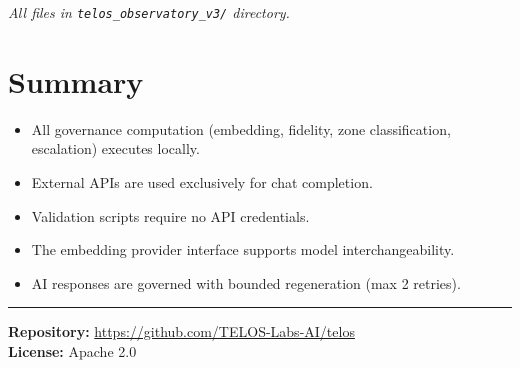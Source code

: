 \documentclass[11pt,twocolumn]{article}
\begin{document}
\noindent\textit{All files in \texttt{telos\_observatory\_v3/} directory.}

\section{Summary}

\begin{itemize}
    \item All governance computation (embedding, fidelity, zone classification, escalation) executes locally.
    \item External APIs are used exclusively for chat completion.
    \item Validation scripts require no API credentials.
    \item The embedding provider interface supports model interchangeability.
    \item AI responses are governed with bounded regeneration (max 2 retries).
\end{itemize}

\vspace{1em}
\hrule
\vspace{0.5em}
\textbf{Repository:} \url{https://github.com/TELOS-Labs-AI/telos}\\
\textbf{License:} Apache 2.0
\end{document}
